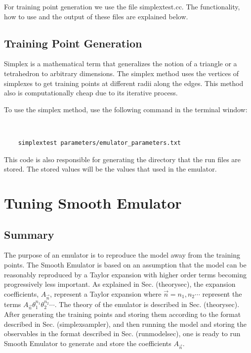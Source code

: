 \documentclass[12pt]{article}
\numberwithin{equation}{section}
\numberwithin{figure}{section}
\begin{document}
For training point generation we use the file simplextest.cc. The functionality, how to use and the output of these files are explained below.

\subsection{Training Point Generation}

Simplex is a mathematical term that generalizes the notion of a triangle or a tetrahedron to arbitrary dimensions. The simplex method uses the vertices of simplexes to get training points at different radii along the edges. This method also is computationally cheap due to its iterative process.

To use the simplex method, use the following command in the terminal window:

{\tt
{
\begin{verbatim}
    simplextest parameters/emulator_parameters.txt
\end{verbatim}
}}

This code is also responsible for generating the directory that the run files are stored. The stored values will be the values that used in the emulator.

\section{Tuning Smooth Emulator}

\subsection{Summary}

The purpose of an emulator is to reproduce the model away from the training points. The Smooth Emulator is based on an assumption that the model can be reasonably reproduced by a Taylor expansion with higher order terms becoming progressively less important. As explained in Sec. (theorysec), the expansion coefficients, $A_{\vec{n}}$, represent a Taylor expansion where $\vec{n}=n_1,n_2\cdots$ represent the terms $A_{\vec{n}}\theta_1^{n_1}\theta_2^{n_2}\cdots$. The theory of the emulator is described in Sec. (theorysec).  After generating the training points and storing them according to the format described in Sec. (simplexsampler), and then running the model and storing the observables in the format described in Sec. (runmodelsec), one is ready to run Smooth Emulator to generate and store the coefficients $A_{\vec{n}}$. 
\end{document}
